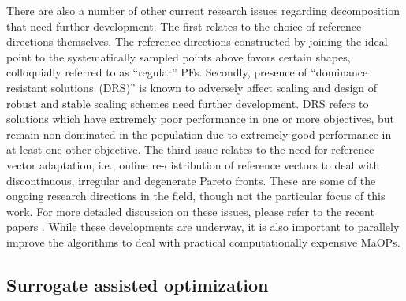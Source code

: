 {\color{blue}There are also a number of other current research issues regarding decomposition that need further development}. The first relates to the choice of reference directions themselves. The reference directions constructed by joining the ideal point to the systematically sampled points above favors certain shapes, colloquially referred to as ``regular'' PFs. Secondly, presence of ``dominance resistant solutions~(DRS)'' is known to adversely affect scaling and design of robust and stable scaling schemes need further development. DRS refers to solutions which have extremely poor performance in one or more objectives, but remain non-dominated in the population due to extremely good performance in at least one other objective. The third issue relates to the need for reference vector adaptation, i.e., online re-distribution of reference vectors to deal with discontinuous, irregular and degenerate Pareto fronts. {\color{blue}These are some of the ongoing research directions in the field, though not the particular focus of this work. For more detailed discussion on these issues, please refer to the recent papers \cite{bhattacharjee2017decomposition,asaf2017enhanced,KHTishibuchi2016inverse}. While these developments are underway, it is also important to parallely improve the algorithms to deal with practical computationally expensive MaOPs}.

\vspace{-0.3em}
\subsection{Surrogate assisted optimization}

